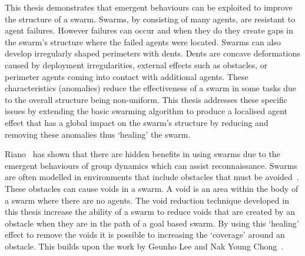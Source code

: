 
This thesis demonstrates that emergent behaviours can be exploited to improve
the structure of a swarm. Swarms, by consisting of many agents, are resistant
to agent failures. However failures can occur and when they do they create gaps
in the swarm's structure where the failed agents were located. Swarms can also
develop irregularly shaped perimeters with dents. Dents are concave
deformations caused by deployment irregularities, external effects such as
obstacles, or perimeter agents coming into contact with additional agents.
These characteristics (anomalies) reduce the effectiveness of a swarm in some
tasks due to the overall structure being non-uniform. This thesis addresses
these specific issues by extending the basic swarming algorithm to produce a
localised agent effect that has a global impact on the swarm's structure by
reducing and removing these anomalies thus `healing' the swarm.


Riano~\cite{RM:11} has shown that there are hidden benefits in using swarms due to the emergent behaviours of group dynamics which can assist reconnaissance. Swarms are often modelled in environments that include obstacles that must be avoided~\cite{VG:05, BAB:12, TRI:15}. These obstacles can cause voids in a swarm. A void is an area within the body of a swarm where there are no agents. The void reduction technique developed in this thesis increase the ability of a swarm to reduce voids that are created by an obstacle when they are in the path of a goal based swarm. By using this `healing' effect to remove the voids it is possible to increasing the `coverage' around an obstacle. This builds upon the work by Geunho Lee and Nak Young Chong~\cite{GN:08}. 

